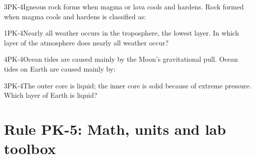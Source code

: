 \documentclass[11pt]{article}
\begin{document}
\begin{q}{3}{PK-4}{Igneous rock forms when magma or lava cools and hardens.}
Rock formed when magma cools and hardens is classified as:
\end{q}

\begin{q}{1}{PK-4}{Nearly all weather occurs in the troposphere, the lowest layer.}
In which layer of the atmosphere does nearly all weather occur?
\end{q}

\begin{q}{4}{PK-4}{Ocean tides are caused mainly by the Moon's gravitational pull.}
Ocean tides on Earth are caused mainly by:
\end{q}

\begin{q}{3}{PK-4}{The outer core is liquid; the inner core is solid because of extreme pressure.}
Which layer of Earth is liquid?
\end{q}

\section{Rule PK-5: Math, units and lab toolbox}
\end{document}
